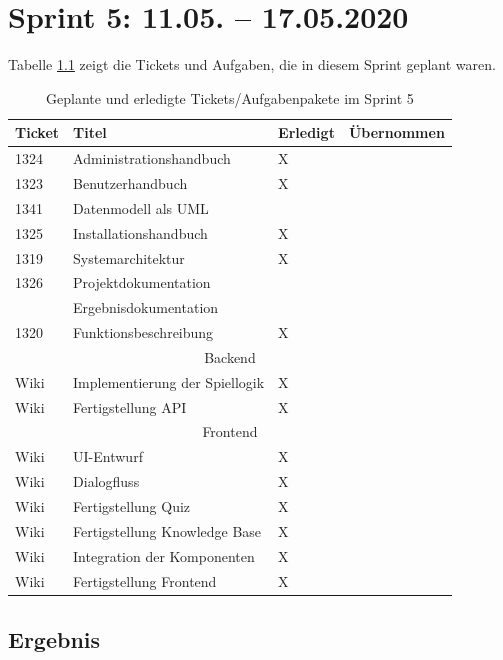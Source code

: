 \documentclass[a4paper,11pt,listof=numbered,glossary=totoc,parskip=half,toc=bib]{scrreprt}
\begin{document}
    \chapter{Sprint 5: 11.05. – 17.05.2020}
  Tabelle \ref{tab:sprint5} zeigt die Tickets und Aufgaben, die in diesem Sprint geplant waren.
  
 \begin{table}   
    \begin{tabularx}{\textwidth}{lXll}
			\toprule
			\textbf{Ticket} & \textbf{Titel} & \textbf{Erledigt} & \textbf{Übernommen} \\
			\midrule
1324	&	Administrationshandbuch	&	X	&		\\
1323	&	Benutzerhandbuch	&	X	&		\\
1341	&	Datenmodell als UML	&		&		\\
1325	&	Installationshandbuch	&	X	&		\\
1319	&	Systemarchitektur	&	X	&		\\
1326	&	Projektdokumentation	&		&		\\
	&	Ergebnisdokumentation	&		&		\\
1320	&	Funktionsbeschreibung	&	X	&		\\

					\midrule
		\multicolumn{4}{c}{Backend}\\
		\midrule
Wiki	&	Implementierung der Spiellogik	&	X	&		\\
Wiki	&	Fertigstellung API	&	X	&		\\
		\midrule
		\multicolumn{4}{c}{Frontend}\\
		\midrule
Wiki	&	UI-Entwurf	&	X	&		\\
Wiki	&	Dialogfluss	&	X	&		\\
Wiki	&	Fertigstellung Quiz	&	X	&		\\
Wiki	&	Fertigstellung Knowledge Base	&	X	&		\\
Wiki	&	Integration der Komponenten	&	X	&		\\
Wiki	&	Fertigstellung Frontend	&	X	&		\\

			\bottomrule
		\end{tabularx}
\caption{Geplante und erledigte Tickets/Aufgabenpakete im Sprint 5}
\label{tab:sprint5}
\end{table}
    
    \section{Ergebnis}
    
\end{document}
